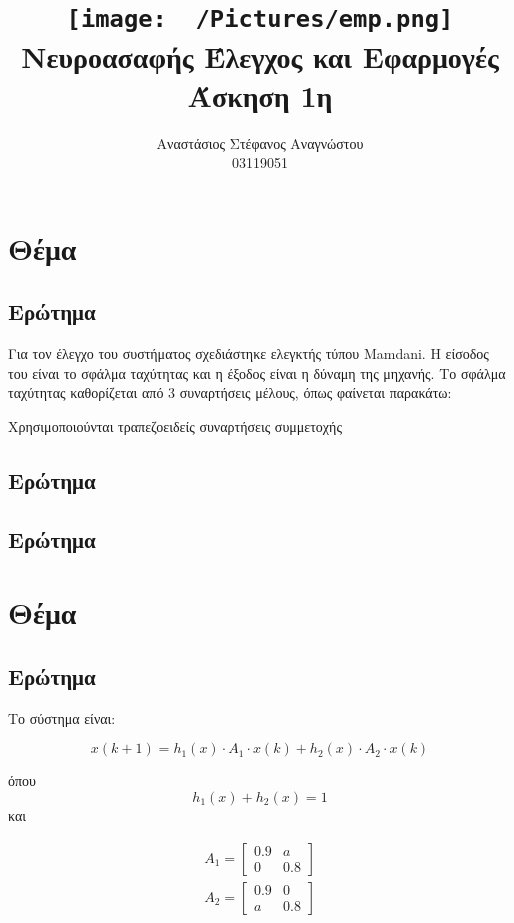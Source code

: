 \documentclass{article}
\title{
    \texttt{[image: ~/Pictures/emp.png]} \\
    \vskip 5cm
    Νευροασαφής Έλεγχος και Εφαρμογές\\
    \large Άσκηση 1η
    \vskip 5cm
}
\author{Αναστάσιος Στέφανος Αναγνώστου\\
        03119051}
\newcommand{\eng}[1]{\foreignlanguage{english}{#1}} %
\begin{document}
\maketitle
\newpage
\tableofcontents
\newpage

\section{Θέμα}

\subsection{Ερώτημα}

Για τον έλεγχο του συστήματος σχεδιάστηκε ελεγκτής τύπου \eng{Mamdani}. Η
είσοδος του είναι το σφάλμα ταχύτητας και η έξοδος είναι η δύναμη της μηχανής.
Το σφάλμα ταχύτητας καθορίζεται από 3 συναρτήσεις μέλους, όπως φαίνεται παρακάτω:

 

Χρησιμοποιούνται τραπεζοειδείς συναρτήσεις συμμετοχής

\subsection{Ερώτημα}

\subsection{Ερώτημα}

\clearpage
\section{Θέμα}

\subsection{Ερώτημα}

Το σύστημα είναι:

\begin{equation}
    x(k+1) = h_1(x) \cdot A_1 \cdot x(k) + h_2(x) \cdot A_2 \cdot x(k)
\end{equation}

όπου  
\begin{equation}
    h_1(x) + h_2(x) = 1
\end{equation}
και 

\begin{equation}
    \begin{aligned}
        Α_1 = \begin{bmatrix} 0.9 & a \\ 0 & 0.8 \end{bmatrix}\\
        A_2 = \begin{bmatrix} 0.9 & 0 \\ a & 0.8 \end{bmatrix}
    \end{aligned}
\end{equation}
\end{document}
